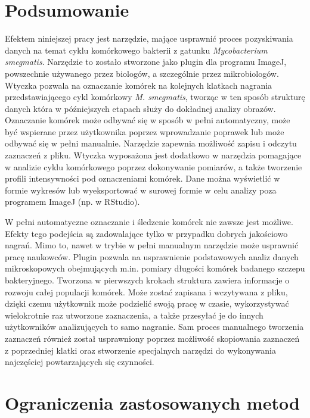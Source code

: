 \documentclass[declaration,shortabstract,mgr]{iithesis}
\begin{document}


\section{Podsumowanie}

Efektem niniejszej pracy jest narzędzie, mające usprawnić proces pozyskiwania danych na temat cyklu komórkowego bakterii z gatunku \emph{Mycobacterium smegmatis}.
Narzędzie to zostało stworzone jako plugin dla programu ImageJ, powszechnie używanego przez biologów, a szczególnie przez mikrobiologów.
Wtyczka pozwala na oznaczanie komórek na kolejnych klatkach nagrania przedstawiającego cykl komórkowy \emph{M. smegmatis}, tworząc w ten sposób strukturę danych która w późniejszych etapach służy do dokładnej analizy obrazów.
Oznaczanie komórek może odbywać się w sposób w pełni automatyczny, może być wspierane przez użytkownika poprzez wprowadzanie poprawek lub może odbywać się w pełni manualnie.
Narzędzie zapewnia możliwość zapisu i odczytu zaznaczeń z pliku.
Wtyczka wyposażona jest dodatkowo w narzędzia pomagające w analizie cyklu komórkowego poprzez dokonywanie pomiarów, a także tworzenie profili intensywności pod oznaczeniami komórek.
Dane można wyświetlić w formie wykresów lub wyeksportować w surowej formie w celu analizy poza programem ImageJ (np. w RStudio).

W pełni automatyczne oznaczanie i śledzenie komórek nie zawsze jest możliwe.
Efekty tego podejścia są zadowalające tylko w przypadku dobrych jakościowo nagrań.
Mimo to, nawet w trybie w pełni manualnym narzędzie może usprawnić pracę naukowców.
Plugin pozwala na usprawnienie podstawowych analiz danych mikroskopowych obejmujących m.in. pomiary długości komórek badanego szczepu bakteryjnego.
Tworzona w pierwszych krokach struktura zawiera informacje o rozwoju całej populacji komórek.
Może zostać zapisana i wczytywana z pliku, dzięki czemu użytkownik może podzielić swoją pracę w czasie, wykorzystywać wielokrotnie raz utworzone zaznaczenia, a także przesyłać je do innych użytkowników analizujących to samo nagranie.
Sam proces manualnego tworzenia zaznaczeń również został usprawniony poprzez możliwość skopiowania zaznaczeń z poprzedniej klatki oraz stworzenie specjalnych narzędzi do wykonywania najczęściej powtarzających się czynności.

\section{Ograniczenia zastosowanych metod}
\end{document}
